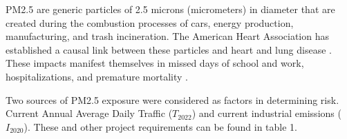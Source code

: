 \documentclass[article,12pt]{article}
\numberwithin{equation}{section}
\begin{document}
PM2.5 are generic particles of 2.5 microns (micrometers) in diameter that are created during the combustion processes of cars, energy production, manufacturing, and trash incineration. The American Heart Association has established a causal link between these particles and heart and lung disease \cite{healthprofess}. These impacts manifest themselves in missed days of school and work, hospitalizations, and premature mortality \cite{hubbell2009}. 

Two sources of PM2.5 exposure were considered as factors in determining risk. Current Annual Average Daily Traffic ($T_{2022}$) and current industrial emissions ($I_{2020}$). These and other project requirements can be found in table 1.

\newpage
\vspace*{-1in} 
\enlargethispage{1in}
\end{document}
